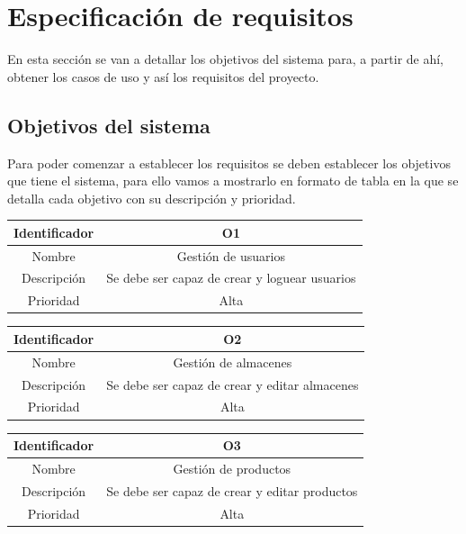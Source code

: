 \chapter{Especificación de requisitos}
\label{requisitos}
En esta sección se van a detallar los objetivos del sistema para, a partir de ahí, obtener los casos de uso y así los requisitos del proyecto.
\section{Objetivos del sistema}
Para poder comenzar a establecer los requisitos se deben establecer los objetivos que tiene el sistema, para ello vamos a mostrarlo en formato de tabla en la que se detalla cada objetivo con su descripción y prioridad.

\vspace{1em}
\par
\begin{tabular}{||c|c||} 
\hline
Identificador & O1 \\ [0.5ex] 
\hline\hline
Nombre & Gestión de usuarios \\ 
\hline
Descripción & Se debe ser capaz de crear y loguear usuarios \\
\hline
Prioridad & Alta \\ [1ex] 
\hline
\end{tabular}

\vspace{1em}
\par
\begin{tabular}{||c|c||} 
\hline
Identificador & O2 \\ [0.5ex] 
\hline\hline
Nombre & Gestión de almacenes \\ 
\hline
Descripción & Se debe ser capaz de crear y editar almacenes \\
\hline
Prioridad & Alta \\ [1ex] 
\hline
\end{tabular}

\vspace{1em}
\par
\begin{tabular}{||c|c||} 
\hline
Identificador & O3 \\ [0.5ex] 
\hline\hline
Nombre & Gestión de productos \\ 
\hline
Descripción & Se debe ser capaz de crear y editar productos \\
\hline
Prioridad & Alta \\ [1ex] 
\hline
\end{tabular}

